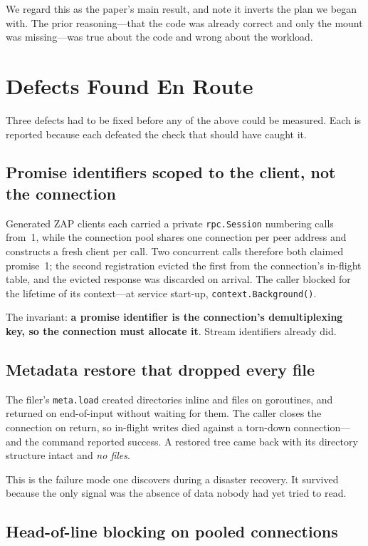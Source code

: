 \documentclass[11pt]{article}
\begin{document}
We regard this as the paper's main result, and note it inverts the plan we
began with. The prior reasoning---that the code was already correct and only
the mount was missing---was true about the code and wrong about the
workload.

\section{Defects Found En Route}

Three defects had to be fixed before any of the above could be measured.
Each is reported because each defeated the check that should have caught it.

\subsection{Promise identifiers scoped to the client, not the connection}

Generated ZAP clients each carried a private \texttt{rpc.Session} numbering
calls from~1, while the connection pool shares one connection per peer
address and constructs a fresh client per call. Two concurrent calls
therefore both claimed promise~1; the second registration evicted the first
from the connection's in-flight table, and the evicted response was discarded
on arrival. The caller blocked for the lifetime of its context---at service
start-up, \texttt{context.Background()}.

The invariant: \textbf{a promise identifier is the connection's
demultiplexing key, so the connection must allocate it}. Stream identifiers
already did.

\subsection{Metadata restore that dropped every file}

The filer's \texttt{meta.load} created directories inline and files on
goroutines, and returned on end-of-input without waiting for them. The caller
closes the connection on return, so in-flight writes died against a torn-down
connection---and the command reported success. A restored tree came back with
its directory structure intact and \emph{no files}.

This is the failure mode one discovers during a disaster recovery. It
survived because the only signal was the absence of data nobody had yet
tried to read.

\subsection{Head-of-line blocking on pooled connections}
\label{sec:hol}
\end{document}
